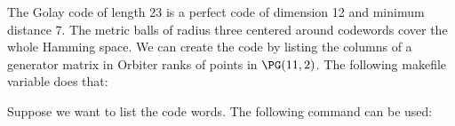 
The Golay code of length 23 is a perfect code of dimension 12 and minimum distance 7.
The metric balls of radius three centered around codewords cover the whole Hamming space.
We can create the code by listing the columns 
of a generator matrix in Orbiter ranks of points in $\PG(11,2)$.
The following makefile variable does that:


Suppose we want to list the code words. The following command can be used:


